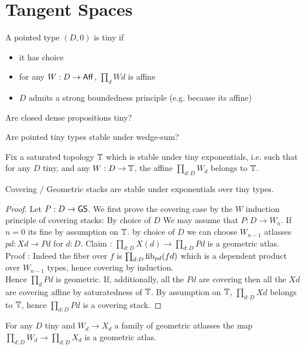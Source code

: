 \section{Tangent Spaces}
\begin{definition}
	A pointed type $(D,0)$ is tiny if
	\begin{itemize}	
		\item it has choice
		\item for any $W : D \to \mathsf{Aff}$, $\prod_d W d$ is affine
		\item $D$ admits a strong boundedness principle (e.g. because its affine)
	\end{itemize}
\end{definition}
\begin{question}
	Are closed dense propositions tiny?
\end{question}
\begin{question}
	Are pointed tiny types stable under wedge-sum?
\end{question}
Fix a saturated topology $\mathbb{T}$ which is stable under tiny exponentials, i.e. such that for any $D$ tiny, and any $W : D \to \mathbb{T}$, the affine $\prod_{d:D} W_d$ belongs to $\mathbb{T}$.
\begin{theorem}
	Covering / Geometric stacks are stable under exponentials over tiny types.
\end{theorem}
\begin{proof}
	Let $P : D \to \mathsf{GS}$. 
	We first prove the covering case by the $W$ induction principle of covering stacks: By choice of $D$ We may assume that $P : D \to W_n$. If $n = 0$ its fine by assumption on $\mathbb{T}$.
	by choice of $D$ we can choose $W_{n-1}$ atlasses $p d : X d \to P d$ for $d : D$.
	Claim :  $\prod_{d: D} X(d) \to \prod_{d : D} P d$ is a geometric atlas.
	Proof : Indeed the fiber over $f$ is $\prod_{d : D} \operatorname{fib}_{p d} (f d)$ which is a dependent product over $W_{n-1}$ types, hence covering by induction. \\
	Hence $\prod_d P d$ is geometric.
	If, additionally, all the $P d$ are covering then all the $X d$ are covering affine by saturatedness of $\mathbb{T}$. By assumption on $\mathbb{T}$, $\prod_{d: D} X d$ belongs to $\mathbb{T}$, hence $\prod_{d: D} P d$ is a covering stack.
\end{proof}
\begin{corollary}{\label{cor:GeomAtlExpStable}}
		For any $D$ tiny and $W_d \to X_d$ a family of geometric atlasses the map $\prod_{d : D} W_d \to \prod_{d: D} X_d$ is a geometric atlas.
\end{corollary}

